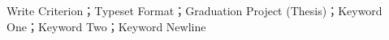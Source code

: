 \begin{enabstract}{Write Criterion；Typeset Format；Graduation Project (Thesis)；Keyword One；Keyword Two；Keyword Newline}
\lipsum[10]
\end{enabstract}


